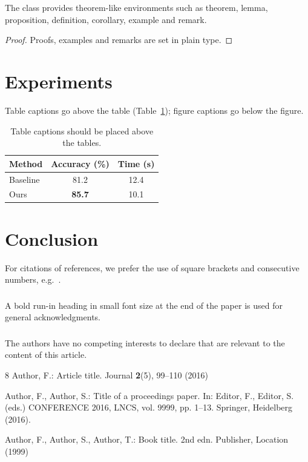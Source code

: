 \documentclass[runningheads]{llncs}
\begin{document}
\begin{theorem}
The class provides theorem-like environments such as theorem, lemma, proposition, definition,
corollary, example and remark.
\end{theorem}

\begin{proof}
Proofs, examples and remarks are set in plain type.
\end{proof}

\section{Experiments}
Table captions go above the table (Table~\ref{tab:results}); figure captions go below the
figure.

\begin{table}
  \caption{Table captions should be placed above the tables.}
  \label{tab:results}
  \centering
  \begin{tabular}{lcc}
    \toprule
    Method & Accuracy (\%) & Time (s) \\
    \midrule
    Baseline & 81.2 & 12.4 \\
    Ours & \textbf{85.7} & 10.1 \\
    \bottomrule
  \end{tabular}
\end{table}

\section{Conclusion}
For citations of references, we prefer the use of square brackets and consecutive numbers,
e.g.\ \cite{ref_article1,ref_lncs1,ref_book1}.

\begin{credits}
\subsubsection{\ackname} A bold run-in heading in small font size at the end of the paper is
used for general acknowledgments.

\subsubsection{\discintname}
The authors have no competing interests to declare that are relevant to the content of this
article.
\end{credits}

\begin{thebibliography}{8}
Author, F.: Article title. Journal \textbf{2}(5), 99--110 (2016)

Author, F., Author, S.: Title of a proceedings paper. In: Editor, F., Editor, S. (eds.)
CONFERENCE 2016, LNCS, vol. 9999, pp. 1--13. Springer, Heidelberg (2016).

Author, F., Author, S., Author, T.: Book title. 2nd edn. Publisher, Location (1999)
\end{thebibliography}
\end{document}
